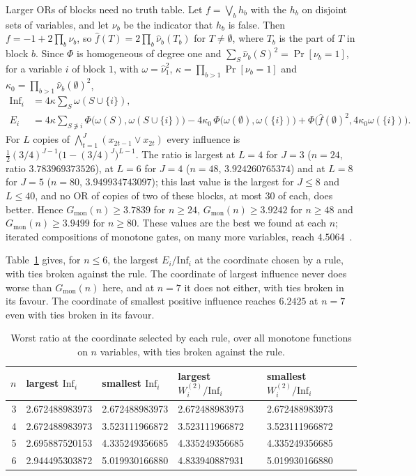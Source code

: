 \documentclass[11pt]{amsart}
\theoremstyle{remark}
\newcommand{\Inf}{\mathrm{Inf}}
\begin{document}
Larger ORs of blocks need no truth table. Let $f=\bigvee_b h_b$ with the $h_b$ on disjoint sets of variables, and let $\nu_b$ be the indicator that $h_b$ is false. Then $f=-1+2\prod_b\nu_b$, so $\hat f(T)=2\prod_b\hat\nu_b(T_b)$ for
$T\ne\emptyset$, where $T_b$ is the part of $T$ in block $b$. Since $\Phi$ is homogeneous of degree one and
$\sum_S\hat\nu_b(S)^2=\Pr[\nu_b=1]$, for a variable $i$ of block $1$, with $\omega=\hat\nu_1^2$, $\kappa=\prod_{b>1}\Pr[\nu_b=1]$ and
$\kappa_0=\prod_{b>1}\hat\nu_b(\emptyset)^2$,
\begin{align*}
\Inf_i&=4\kappa\sum_S\omega(S\cup\{i\}),\\
E_i&=4\kappa\sum_{S\not\ni i}\Phi\bigl(\omega(S),\omega(S\cup\{i\})\bigr)-4\kappa_0\,\Phi\bigl(\omega(\emptyset),\omega(\{i\})\bigr)
+\Phi\bigl(\hat f(\emptyset)^2,4\kappa_0\omega(\{i\})\bigr).
\end{align*}
For $L$ copies of $\bigwedge_{t=1}^{J}(x_{2t-1}\vee x_{2t})$ every influence is
$\frac12(3/4)^{J-1}\bigl(1-(3/4)^J\bigr)^{L-1}$. The ratio is largest at $L=4$ for $J=3$ ($n=24$, ratio
$3.783969373526$), at $L=6$ for $J=4$ ($n=48$, $3.924260765374$) and at $L=8$ for $J=5$ ($n=80$,
$3.949934743097$); this last value is the largest for $J\le8$ and $L\le40$, and no OR of copies of two of these blocks,
at most $30$ of each, does better. Hence $G_{\mathrm{mon}}(n)\ge3.7839$ for $n\ge24$, $G_{\mathrm{mon}}(n)\ge3.9242$
for $n\ge48$ and $G_{\mathrm{mon}}(n)\ge3.9499$ for $n\ge80$. These values are the best we found at each $n$; iterated compositions of monotone gates, on many more variables,
reach $4.5064$~\cite[Proposition~3.1]{Shm3}.

Table~\ref{tab:rules} gives, for $n\le6$, the largest $E_i/\Inf_i$ at the coordinate chosen by a rule, with ties
broken against the rule. The coordinate of largest influence never does worse than $G_{\mathrm{mon}}(n)$ here, and at
$n=7$ it does not either, with ties broken in its favour. The coordinate of smallest positive influence reaches
$6.2425$ at $n=7$ even with ties broken in its favour.

\begin{table}[tbp]
\centering
\begin{tabular}{rllll}
\toprule
$n$ & largest $\Inf_i$ & smallest $\Inf_i$ & largest $W^{(2)}_i/\Inf_i$ & smallest $W^{(2)}_i/\Inf_i$\\\midrule
3 & 2.672488983973 & 2.672488983973 & 2.672488983973 & 2.672488983973\\
4 & 2.672488983973 & 3.523111966872 & 3.523111966872 & 3.523111966872\\
5 & 2.695887520153 & 4.335249356685 & 4.335249356685 & 4.335249356685\\
6 & 2.944495303872 & 5.019930166880 & 4.833940887931 & 5.019930166880\\
\bottomrule
\end{tabular}
\caption{Worst ratio at the coordinate selected by each rule, over all monotone functions on $n$ variables,
with ties broken against the rule.}
\label{tab:rules}
\end{table}
\end{document}
